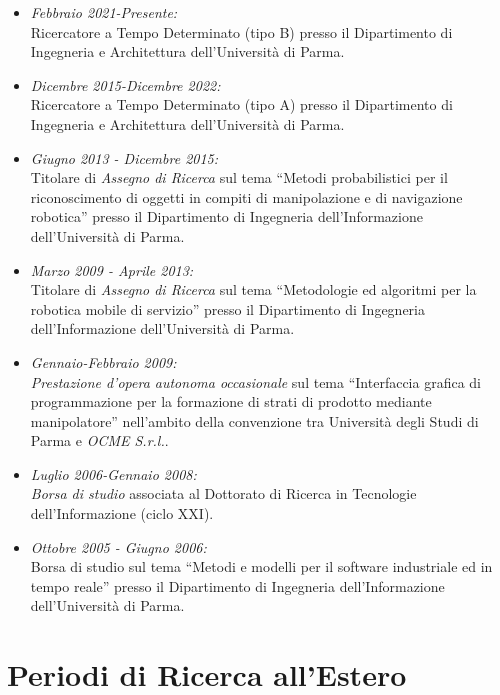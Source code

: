 \documentclass[11pt]{article}
\newcommand{\ITEMDATE}[1]{\item \textit{#1:}\\}
\begin{document}
\begin{itemize}
\ITEMDATE{Febbraio 2021-Presente} 
Ricercatore a Tempo Determinato (tipo B) presso il Dipartimento di Ingegneria e Architettura dell'Universit\`a di Parma.

\ITEMDATE{Dicembre 2015-Dicembre 2022} 
Ricercatore a Tempo Determinato (tipo A) presso il Dipartimento di Ingegneria e Architettura dell'Universit\`a di Parma.

\ITEMDATE{Giugno 2013 - Dicembre 2015} 
Titolare di \emph{Assegno di Ricerca} sul tema 
``Metodi probabilistici per il riconoscimento di oggetti in compiti di manipolazione e di navigazione robotica''
presso il Dipartimento di Ingegneria dell'Informazione dell'Universit\`a di Parma.

\ITEMDATE{Marzo 2009 - Aprile 2013} 
Titolare di \emph{Assegno di Ricerca} sul tema ``Metodologie ed algoritmi per la robotica mobile di servizio''
presso il Dipartimento di Ingegneria dell'Informazione dell'Universit\`a di Parma.

\ITEMDATE{Gennaio-Febbraio 2009} 
\emph{Prestazione d'opera autonoma occasionale} sul tema ``Interfaccia grafica di 
programmazione per la formazione di strati di prodotto mediante manipolatore'' 
nell'ambito della convenzione tra Universit\`a degli Studi di Parma e \emph{OCME S.r.l.}.

\ITEMDATE{Luglio 2006-Gennaio 2008} 
\emph{Borsa di studio} associata al Dottorato di Ricerca in Tecnologie dell'Informazione (ciclo XXI).

\ITEMDATE{Ottobre 2005 - Giugno 2006}
Borsa di studio sul tema ``Metodi e modelli per il software 
industriale ed in tempo reale'' presso %
il Dipartimento di Ingegneria dell'Informazione dell'Universit\`a di Parma.

\end{itemize}


\section*{Periodi di Ricerca all'Estero}
\end{document}

